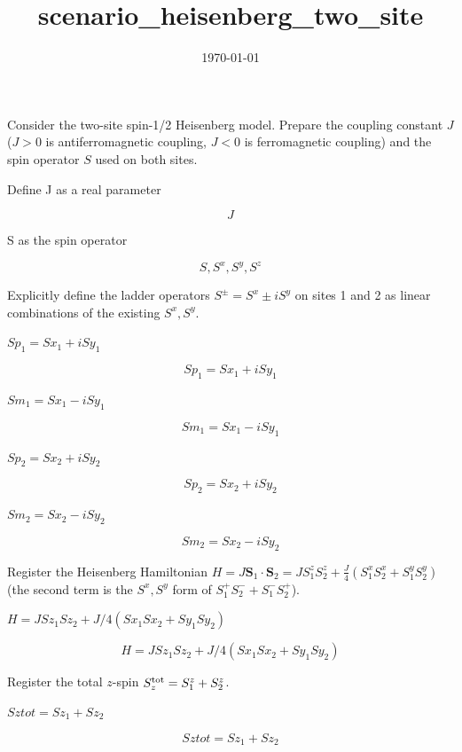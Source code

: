 \documentclass[dvipdfmx]{article}
\title{scenario\_heisenberg\_two\_site}
\date{\today}
\begin{document}
\maketitle

Consider the two-site spin-1/2 Heisenberg model. Prepare the coupling constant $J$ ($J>0$ is antiferromagnetic coupling, $J<0$ is ferromagnetic coupling) and the spin operator $S$ used on both sites.

Define J as a real parameter

\[
  J
\]

S as the spin operator

\[
  S, S^{x}, S^{y}, S^{z}
\]

Explicitly define the ladder operators $S^\pm=S^x\pm iS^y$ on sites 1 and 2 as linear combinations of the existing $S^x,S^y$.

$Sp_1 = Sx_1 + i Sy_1$

\begin{equation}
  Sp_1 = Sx_1 + i Sy_1
  \label{eq:E1}
\end{equation}

$Sm_1 = Sx_1 - i Sy_1$

\begin{equation}
  Sm_1 = Sx_1 - i Sy_1
  \label{eq:E2}
\end{equation}

$Sp_2 = Sx_2 + i Sy_2$

\begin{equation}
  Sp_2 = Sx_2 + i Sy_2
  \label{eq:E3}
\end{equation}

$Sm_2 = Sx_2 - i Sy_2$

\begin{equation}
  Sm_2 = Sx_2 - i Sy_2
  \label{eq:E4}
\end{equation}

Register the Heisenberg Hamiltonian $H=J\mathbf S_1\cdot\mathbf S_2=JS_1^zS_2^z+\frac{J}{4}(S_1^xS_2^x+S_1^yS_2^y)$ (the second term is the $S^x,S^y$ form of $S_1^+S_2^-+S_1^-S_2^+$).

$H = J Sz_1 Sz_2 + J/4 (Sx_1 Sx_2 + Sy_1 Sy_2)$

\begin{equation}
  H = J Sz_1 Sz_2 + J/4 (Sx_1 Sx_2 + Sy_1 Sy_2)
  \label{eq:E5}
\end{equation}

Register the total $z$-spin $S_z^{\rm tot}=S_1^z+S_2^z$.

$Sztot = Sz_1 + Sz_2$

\begin{equation}
  Sztot = Sz_1 + Sz_2
  \label{eq:E6}
\end{equation}
\end{document}
